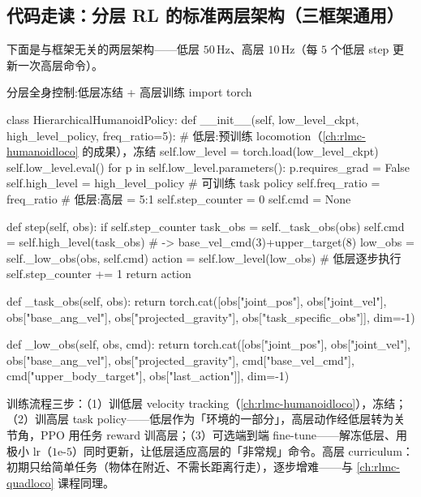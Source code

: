 \subsection{代码走读：分层 RL 的标准两层架构（三框架通用）}
下面是与框架无关的两层架构——低层 $50$\,Hz、高层 $10$\,Hz（每 $5$ 个低层 step 更新一次高层命令）。

\begin{codebox}[Python]{分层全身控制:低层冻结 + 高层训练}
import torch

class HierarchicalHumanoidPolicy:
    def __init__(self, low_level_ckpt, high_level_policy, freq_ratio=5):
        # 低层:预训练 locomotion（\cref{ch:rlmc-humanoidloco} 的成果），冻结
        self.low_level = torch.load(low_level_ckpt)
        self.low_level.eval()
        for p in self.low_level.parameters():
            p.requires_grad = False
        self.high_level = high_level_policy        # 可训练 task policy
        self.freq_ratio = freq_ratio               # 低层:高层 = 5:1
        self.step_counter = 0
        self.cmd = None

    def step(self, obs):
        if self.step_counter %
            task_obs = self._task_obs(obs)
            self.cmd = self.high_level(task_obs)            # -> base_vel_cmd(3)+upper_target(8)
        low_obs = self._low_obs(obs, self.cmd)
        action = self.low_level(low_obs)                    # 低层逐步执行
        self.step_counter += 1
        return action

    def _task_obs(self, obs):
        return torch.cat([obs["joint_pos"], obs["joint_vel"], obs["base_ang_vel"],
                          obs["projected_gravity"], obs["task_specific_obs"]], dim=-1)

    def _low_obs(self, obs, cmd):
        return torch.cat([obs["joint_pos"], obs["joint_vel"], obs["base_ang_vel"],
                          obs["projected_gravity"], cmd["base_vel_cmd"],
                          cmd["upper_body_target"], obs["last_action"]], dim=-1)
\end{codebox}

训练流程三步：（1）训低层 velocity tracking（\cref{ch:rlmc-humanoidloco}），冻结；（2）训高层 task policy——低层作为「环境的一部分」，高层动作经低层转为关节角，PPO 用任务 reward 训高层；（3）可选端到端 fine-tune——解冻低层、用极小 lr（$1\text{e-}5$）同时更新，让低层适应高层的「非常规」命令。高层 curriculum：初期只给简单任务（物体在附近、不需长距离行走），逐步增难——与 \cref{ch:rlmc-quadloco} 课程同理。

